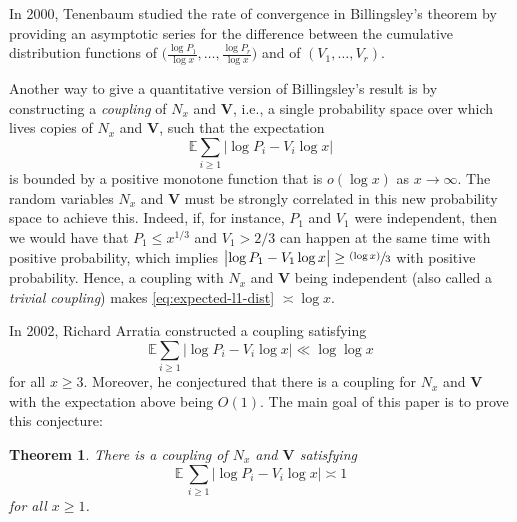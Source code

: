 \documentclass[11pt]{article}
\newcommand{\ie}{i.e.,\xspace}
\newcommand{\bV}{{\boldsymbol V}}
\newcommand{\psfrac}[2]{\sfrac{(#1)}{#2}}
\newcommand{\EE}{\mathbb{E}}
\newcommand{\bg}{\big}
\theoremstyle{plain}
\newtheorem{theo}{Theorem}
\theoremstyle{definition}
\begin{document}
In 2000, Tenenbaum \cite{Tenenbaum00} studied the rate of convergence in Billingsley's theorem by providing an asymptotic series for the difference between the cumulative distribution functions of $\bg(\tfrac{\log P_1}{\log x}, \ldots, \tfrac{\log P_r}{\log x}\bg)$ and of $(V_1, \ldots, V_r)$.

Another way to give a quantitative version of Billingsley's result is by constructing a \emph{coupling} of $N_x$ and $\bV$, \ie a single probability space over which lives copies of $N_x$ and $\bV$, such that the expectation
\begin{equation}
\label{eq:expected-l1-dist}
\EE\sum_{i \ge 1} \bg|{\log P_i - V_i\log x}\bg|
\end{equation}
is bounded by a positive monotone function that is $o(\log x)$ as $x \to \infty$. The random variables $N_x$ and $\bV$ must be strongly correlated in this new probability space to achieve this. Indeed, if, for instance, $P_1$ and $V_1$ were independent, then we would have that $P_1\le x^{1/3}$ and $V_1>2/3$ can happen at the same time with positive probability, which implies $\bg|{\log P_1 - V_1\log x}\bg| \ge \psfrac{\log x}{3}$ with positive probability. Hence, a coupling with $N_x$ and $\bV$ being independent (also called a \emph{trivial coupling}) makes \eqref{eq:expected-l1-dist} $\asymp \log x$.

In 2002, Richard Arratia \cite{Arratia02} constructed a coupling satisfying
\begin{equation}
\label{eq:arratia02-result}
\EE\sum_{i \ge 1} \bg|{\log P_i - V_i\log x}\bg| \ll \log\!\log x
\end{equation}
for all $x \ge 3$. Moreover, he conjectured that there is a coupling for $N_x$ and $\bV$ with the expectation above being $O(1)$. The main goal of this paper is to prove this conjecture:

\begin{theo}
\label{thm:coupling-ub}
There is a coupling of $N_x$ and $\bV$ satisfying
\[
\EE\, \sum_{i \ge 1} \bg|{\log P_i - V_i\log x}\bg| \asymp 1
\]
for all $x \ge 1$.
\end{theo}
\end{document}
